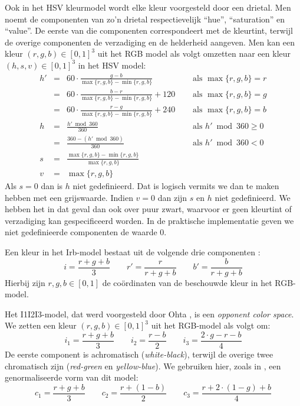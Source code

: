 Ook in het HSV kleurmodel \cite{tkalcic:colour_spaces} wordt elke kleur voorgesteld 
door een drietal. Men noemt de componenten van zo'n drietal respectievelijk 
``hue'', ``saturation'' en ``value''. De eerste van die componenten 
correspondeert met de kleurtint, terwijl de overige componenten de verzadiging 
en de helderheid aangeven. Men kan een kleur $(r,g,b) \in [0,1]^3$ uit het RGB 
model als volgt omzetten naar een kleur $(h,s,v) \in [0,1]^3$ in het HSV model: 
$$
\begin{array}{rcll}
h' & = & 60 \cdot \frac{g - b}{\max \{r,g,b\} - \min \{r,g,b\}}\quad & \textrm{ 
als } \max \{r,g,b\} = r \\[2pt] & = & 60 \cdot \frac{b - r}{\max \{r,g,b\} - 
\min \{r,g,b\}} + 120\quad & \textrm{ als } \max \{r,g,b\} = g \\[2pt] & = & 60 
\cdot \frac{r - g}{\max \{r,g,b\} - \min \{r,g,b\}} + 240\quad & \textrm{ als } 
\max \{r,g,b\} = b \\[6pt] h & = & \frac{h' \bmod 360}{360} & \textrm{ als } h' 
\bmod 360 \geq 0 \\[2pt] & = & \frac{360 - (h' \bmod 360)}{360} & \textrm{ als 
} h' \bmod 360 < 0 \\[6pt] s & = & \frac{\max \{r,g,b\} - \min \{r,g,b\}}{\max 
\{r,g,b\}} & \\[6pt] v & = & \max \{r,g,b\}
\end{array}
$$ Als $s=0$ dan is $h$ niet gedefinieerd. Dat is logisch vermits we dan te 
maken hebben met een grijswaarde. Indien $v=0$ dan zijn $s$ en $h$ niet gedefinieerd. We 
hebben het in dat geval dan ook over puur zwart, waarvoor er geen kleurtint of 
verzadiging kan gespecificeerd worden. In de praktische implementatie geven we 
niet gedefinieerde componenten de waarde $0$.

Een kleur in het Irb-model bestaat uit de volgende drie componenten 
\cite{ohta:color_info_for_region_segm}: $$ i = \frac{r+g+b}{3} \qquad r' = 
\frac{r}{r+g+b} \qquad b' = \frac{b}{r+g+b} $$ Hierbij zijn $r,g,b \in [0,1]$ 
de co\"ordinaten van de beschouwde kleur in het RGB-model. 

Het I1I2I3-model, dat werd voorgesteld door Ohta 
\cite{ohta:color_info_for_region_segm}, is een \emph{opponent color space}. 
We zetten een kleur $(r,g,b) \in 
[0,1]^3$ uit het RGB-model als volgt om: $$
i_1 = \frac{r+g+b}{3} \qquad i_2 = \frac{r-b}{2} \qquad i_3 = \frac{2 \cdot g - 
r - b}{4}
$$ De eerste component is achromatisch (\emph{white-black}), terwijl de overige 
twee chromatisch zijn (\emph{red-green} en \emph{yellow-blue}).
We gebruiken hier, zoals in \cite{wang:cbir_using_daubechies_wavelets}, een 
genormaliseerde vorm van dit model: $$
c_1 = \frac{r+g+b}{3} \qquad c_2 = \frac{r + (1 - b)}{2} \qquad c_3 = \frac{r + 
2 \cdot (1 - g) + b}{4}
$$ 

